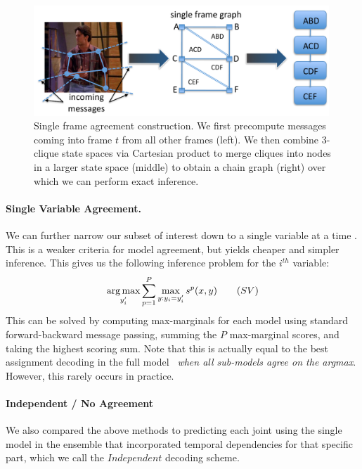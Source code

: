 \begin{figure}[tb]
\begin{center}
\includegraphics[width=0.99\textwidth]{figs/single-frame-agreement.pdf}
\caption[Single Frame Agreement construction]{Single frame agreement 
construction.  We first precompute messages coming into frame $t$ from all 
other frames (left).  We then combine 3-clique state spaces via Cartesian 
product to merge cliques into nodes in a larger state space (middle) to obtain 
a chain graph (right) over which we can perform exact inference.}
\label{fig:single-frame-agreement}
\end{center}
\end{figure}



\paragraph{Single Variable Agreement.} 

We can further narrow our subset of interest down to a single variable
at a time \citep{weisssapp10}.  This is a weaker criteria for model
agreement, but yields cheaper and simpler inference.  This gives us
the following inference problem for the $i^{th}$ variable:
\begin{equation}
\mathop{\arg\max}_{y_i'} \sum_{p=1}^P \max_{y: y_i=y_i'} s^p(x,y) \quad{}\quad{(SV)}
\end{equation}
This can be solved by computing max-marginals for each model using standard forward-backward message passing, summing the $P$ max-marginal scores, and taking the highest scoring sum.
Note that this is actually equal to the best assignment decoding in the full 
model~ {\em when all sub-models agree on the argmax}.  
However, this rarely occurs in practice.

\paragraph{Independent / No Agreement}
We also compared the above methods to predicting each joint using the single 
model in the ensemble that incorporated temporal dependencies for that
specific part, which we call the $Independent$ decoding scheme.



